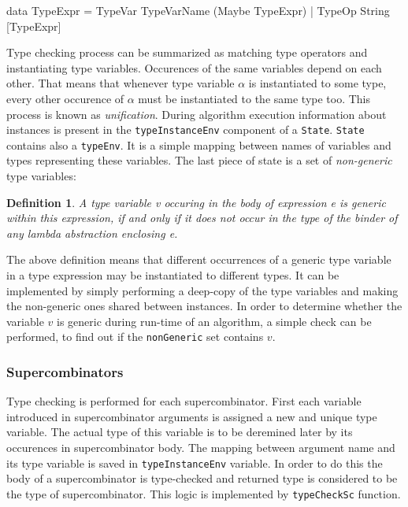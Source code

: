 \documentclass[12pt,a4paper]{report}
\newtheorem{definition}{Definition}[chapter]
\begin{document}
\vspace*{0.2in}
\begin{code}[style=haskell]
data TypeExpr = TypeVar TypeVarName (Maybe TypeExpr)
              | TypeOp String [TypeExpr]
\end{code}

Type checking process can be summarized as matching type operators and
instantiating type variables. Occurences of the same variables depend on each
other. That means that whenever type variable $\alpha$ is instantiated to some
type, every other occurence of $\alpha$ must be instantiated to the same type
too. This process is known as \textit{unification}. During algorithm execution
information about instances is present in the \texttt{typeInstanceEnv}
component of a \texttt{State}. \texttt{State} contains also a \texttt{typeEnv}.
It is a simple mapping between names of variables and types representing these
variables. The last piece of state is a set of \textit{non-generic} type
variables:

\begin{definition}
  A type variable v occuring in the body of expression e is generic within this
  expression, if and only if it does not occur in the type of the binder of any
  lambda abstraction enclosing e.
\end{definition}

The above definition means that different occurrences of a generic type
variable in a type expression may be instantiated to different types. It can be
implemented by simply performing a deep-copy of the type variables and making
the non-generic ones shared between instances. In order to determine whether
the variable $v$ is generic during run-time of an algorithm, a simple check can be
performed, to find out if the \texttt{nonGeneric} set contains $v$.

\subsubsection{Supercombinators}
Type checking is performed for each supercombinator. First each variable
introduced in supercombinator arguments is assigned a new and unique type
variable. The actual type of this variable is to be deremined later by its
occurences in supercombinator body. The mapping between argument name and its
type variable is saved in \texttt{typeInstanceEnv} variable. In order to do
this the body of a supercombinator is type-checked and returned type is
considered to be the type of supercombinator. This logic is implemented by
\texttt{typeCheckSc} function.
\end{document}
